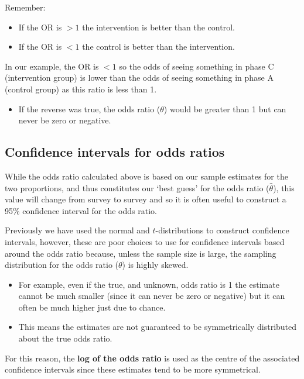 \documentclass[
  oneside]{krantz}
\providecommand{\tightlist}{%
  \setlength{\itemsep}{0pt}\setlength{\parskip}{0pt}}
\begin{document}
Remember:

\begin{itemize}
\item
  If the OR is \(> 1\) the intervention is better than the control.
\item
  If the OR is \(< 1\) the control is better than the intervention.
\end{itemize}

In our example, the OR is \(<1\) so the odds of seeing something in phase C (intervention group) is lower than the odds of seeing something in phase A (control group) as this ratio is less than 1.

\begin{itemize}
\tightlist
\item
  If the reverse was true, the odds ratio (\(\theta\)) would be greater than 1 but can never be zero or negative.
\end{itemize}

\hypertarget{confidence-intervals-for-odds-ratios}{%
\subsection{Confidence intervals for odds ratios}\label{confidence-intervals-for-odds-ratios}}

While the odds ratio calculated above is based on our sample estimates for the two proportions, and thus constitutes our `best guess' for the odds ratio (\(\hat{\theta}\)), this value will change from survey to survey and so it is often useful to construct a 95\% confidence interval for the odds ratio.

Previously we have used the normal and \(t\)-distributions to construct confidence intervals, however, these are poor choices to use for confidence intervals based around the odds ratio because, unless the sample size is large, the sampling distribution for the odds ratio (\(\theta\)) is highly skewed.

\begin{itemize}
\item
  For example, even if the true, and unknown, odds ratio is 1 the estimate cannot be much smaller (since it can never be zero or negative) but it can often be much higher just due to chance.
\item
  This means the estimates are not guaranteed to be symmetrically distributed about the true odds ratio.
\end{itemize}

For this reason, the \textbf{log of the odds ratio} is used as the centre of the associated confidence intervals since these estimates tend to be more symmetrical.
\end{document}
